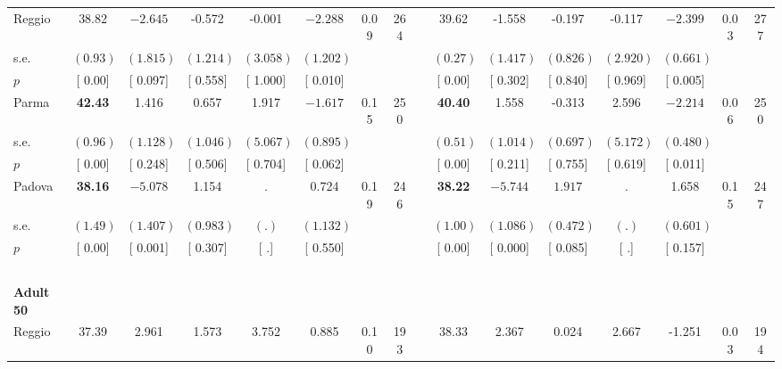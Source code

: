 \begin{longtable}{L{8em} c c c c c c c p{1em} c c c c c c c}
\quad \quad \quad Reggio& 38.82 & $ \mathbf{   -2.645}$ &    -0.572 &    -0.001 & $ \mathbf{   -2.288}$ &      0.09 &       264 & & 39.62 &    -1.558 &    -0.197 &    -0.117 & $ \mathbf{   -2.399}$ &      0.03 &       277  \\*
\quad \quad \quad \quad s.e.& $ (     0.93)$ & $ (    1.815)$ & $ (    1.214)$ & $ (    3.058)$ & $ (    1.202)$ & & & & $ (     0.27)$ & $ (    1.417)$ & $ (    0.826)$ & $ (    2.920)$ & $ (    0.661)$ & &  \\*
\quad \quad \quad \quad $ p$ & [     0.00] & [    0.097] & [    0.558] & [    1.000] & [    0.010] & & & & [     0.00] & [    0.302] & [    0.840] & [    0.969] & [    0.005] & &  \\[1em]
\quad \quad \quad Parma& \textbf{    42.43} &     1.416 &     0.657 &     1.917 & $ \mathbf{   -1.617}$ &      0.15 &       250 & & \textbf{    40.40} &     1.558 &    -0.313 &     2.596 & $ \mathbf{   -2.214}$ &      0.06 &       250  \\*
\quad \quad \quad \quad s.e.& $ (     0.96)$ & $ (    1.128)$ & $ (    1.046)$ & $ (    5.067)$ & $ (    0.895)$ & & & & $ (     0.51)$ & $ (    1.014)$ & $ (    0.697)$ & $ (    5.172)$ & $ (    0.480)$ & &  \\*
\quad \quad \quad \quad $ p$ & [     0.00] & [    0.248] & [    0.506] & [    0.704] & [    0.062] & & & & [     0.00] & [    0.211] & [    0.755] & [    0.619] & [    0.011] & &  \\[1em]
\quad \quad \quad Padova& \textbf{    38.16} & $ \mathbf{   -5.078}$ &     1.154 &         . &     0.724 &      0.19 &       246 & & \textbf{    38.22} & $ \mathbf{   -5.744}$ & $ \mathbf{    1.917}$ &         . &     1.658 &      0.15 &       247  \\*
\quad \quad \quad \quad s.e.& $ (     1.49)$ & $ (    1.407)$ & $ (    0.983)$ & $ (        .)$ & $ (    1.132)$ & & & & $ (     1.00)$ & $ (    1.086)$ & $ (    0.472)$ & $ (        .)$ & $ (    0.601)$ & &  \\*
\quad \quad \quad \quad $ p$ & [     0.00] & [    0.001] & [    0.307] & [        .] & [    0.550] & & & & [     0.00] & [    0.000] & [    0.085] & [        .] & [    0.157] & &  \\[1em]
~\\[1em]
\quad \quad \textbf{Adult 50} & & & & & & & & & & & & & & & \\* 
\quad \quad \quad Reggio& 37.39 &     2.961 &     1.573 &     3.752 &     0.885 &      0.10 &       193 & & 38.33 &     2.367 &     0.024 &     2.667 &    -1.251 &      0.03 &       194  \\*

\end{longtable}
